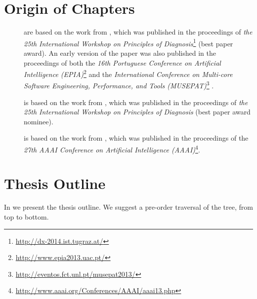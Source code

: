 \section{Origin of Chapters}
\label{sec:intro:origin-of-chapters}
\begin{description}
\item [] are
  based on the work from \cite{Cardoso14a}, which was published in
  the proceedings of \textit{the 25th International Workshop on
    Principles of
    Diagnosis}\footnote{\url{http://dx-2014.ist.tugraz.at/}} (best
  paper award). An early version of the paper was also published in
  the proceedings of both the \textit{16th Portuguese Conference on
    Artificial Intelligence
    (EPIA)}\footnote{\url{http://www.epia2013.uac.pt/}}
  \cite{Cardoso13b} and the \textit{International Conference on
    Multi-core Software Engineering, Performance, and Tools
    (MUSEPAT)}\footnote{\url{http://eventos.fct.unl.pt/musepat2013/}}
  \cite{Cardoso13c}.

\item [] is based on the work from
  \cite{Cardoso14b}, which was published in the proceedings of
  \textit{the 25th International Workshop on Principles of Diagnosis}
  (best paper award nominee).

\item [] is based on the work from \cite{Cardoso13a},
  which was published in the proceedings of the \textit{27th AAAI
    Conference on Artificial Intelligence
    (AAAI)}\footnote{\url{http://www.aaai.org/Conferences/AAAI/aaai13.php}}.
\end{description}

\section{Thesis Outline}
\label{sec:intro:outline}
In  we present the thesis outline.
%
We suggest a pre-order traversal of the tree, from top to bottom.
%




